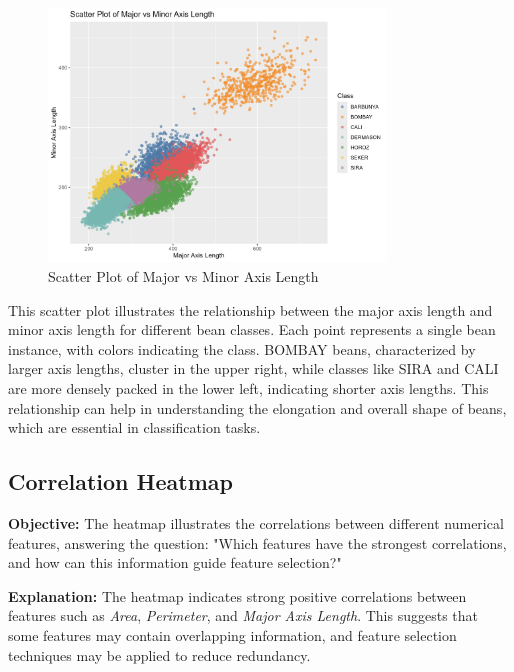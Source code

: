 \documentclass[a4paper,12pt]{article}
\begin{document}
\begin{figure}[H]
    \centering
    \includegraphics[width=0.8\textwidth]{graphs/scatter_major_minor_axis.png}
    \caption{Scatter Plot of Major vs Minor Axis Length}
    \label{fig:scatter_major_minor}
\end{figure}
This scatter plot illustrates the relationship between the major axis length and minor axis length for different bean classes. Each point represents a single bean instance, with colors indicating the class. BOMBAY beans, characterized by larger axis lengths, cluster in the upper right, while classes like SIRA and CALI are more densely packed in the lower left, indicating shorter axis lengths. This relationship can help in understanding the elongation and overall shape of beans, which are essential in classification tasks.

\newpage

\subsection{Correlation Heatmap}
\noindent\textbf{Objective:} The heatmap illustrates the correlations between different numerical features, answering the question: "Which features have the strongest correlations, and how can this information guide feature selection?"

\noindent\textbf{Explanation:} The heatmap indicates strong positive correlations between features such as \textit{Area}, \textit{Perimeter}, and \textit{Major Axis Length}. This suggests that some features may contain overlapping information, and feature selection techniques may be applied to reduce redundancy.
\end{document}
